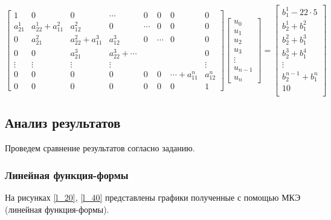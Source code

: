 $$
\begin{bmatrix}
1     &   0        &   0 & \cdots & 0 & 0 & 0  & 0\\
a_{21}^1     &    a_{22}^1+a_{11}^2 & a_{12}^2  & 0 & \cdots & 0 & 0  & 0\\
0     &    a_{21}^2 & a_{22}^2+a_{11}^3  &  a_{12}^3  & 0 & \cdots & 0  & 0\\
0     &    0  & a_{21}^3  & a_{22}^3+ \cdots  &  & &   & 0\\
\vdots & \vdots & \vdots & \vdots &  &  &   & \vdots\\
0 & 0 & 0 & 0 &  0 & 0 & \cdots+a_{11}^n  & a_{12}^n\\
0 & 0 & 0 & 0 &  0 & 0 & 0 & 1
\end{bmatrix}
\begin{bmatrix}
u_0 \\
u_1 \\
u_2\\
u_3\\
\vdots\\
u_{n-1}\\
u_n
\end{bmatrix} =
\begin{bmatrix}
 b_1^1   -22  \cdot 5   \\
b_2^1+b_1^2\\
b_2^2+b_1^3\\
b_2^3+b_1^4\\
\vdots\\
b_2^{n-1}+b_1^n\\
 10   \\
\end{bmatrix}
$$

\subsection{Анализ результатов}

Проведем сравнение результатов согласно заданию.

\subsubsection{Линейная функция-формы}


На рисунках \ref{l_20}, \ref{l_40} представлены графики полученные с помощью МКЭ (линейная функция-формы).

